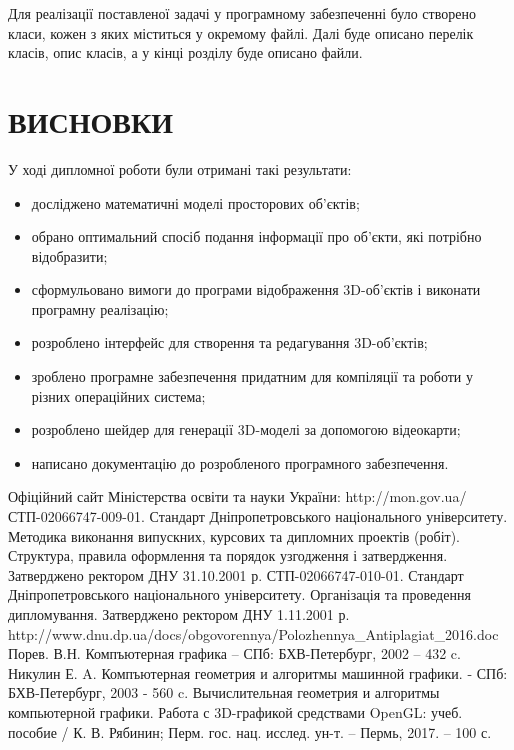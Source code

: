 \let\mypdfximage\pdfximage\def\pdfximage{\immediate\mypdfximage}\documentclass[14pt,a4paper]{extarticle}
\theoremstyle{definition}
\renewcommand{\[}{\begin{singlespace}\begin{equation*}}
\renewcommand{\]}{\end{equation*}\end{singlespace}}
\renewcommand{\+}{\discretionary{\mbox{\scriptsize$\hookleftarrow$}}{}{}}
\begin{document}
Для реалізації поставленої задачі у програмному забезпеченні було створено класи, кожен з яких міститься у окремому файлі. Далі буде описано перелік класів, опис класів, а у кінці розділу буде описано файли.



















\section*{ВИСНОВКИ}
У ході дипломної роботи були отримані такі результати:

\begin{itemize}
\item досліджено математичні моделі просторових об'єктів;
\item обрано оптимальний спосіб подання інформації про об'єкти, які потрібно відобразити;
\item сформульовано вимоги до програми відображення 3D-об'єктів і виконати програмну реалізацію;
\item розроблено інтерфейс для створення та редагування 3D-об'єктів;
\item зроблено програмне забезпечення придатним для компіляції та роботи у різних операційних система;
\item розроблено шейдер для генерації 3D-моделі за допомогою відеокарти;
\item написано документацію до розробленого програмного забезпечення.
\end{itemize}

\begin{thebibliography}{9}
\bibitem{} Офіційний сайт Міністерства освіти та науки України: http://mon.gov.ua/
\bibitem{} СТП-02066747-009-01. Стандарт Дніпропетровського національного університету. Методика виконання випускних, курсових та дипломних проектів (робіт). Структура, правила оформлення та порядок узгодження і затвердження. Затверджено ректором ДНУ 31.10.2001 р.
\bibitem{} СТП-02066747-010-01. Стандарт Дніпропетровського національного університету. Організація та проведення дипломування. Затверджено ректором ДНУ 1.11.2001 р.
\bibitem{} http://www.dnu.dp.ua/docs/obgovorennya/Polozhennya\_Antiplagiat\_2016.doc
 Порев. В.Н. Компъютерная графика -- СПб: БХВ-Петербург, 2002 -- 432 c.
 Никулин Е. A. Компъютерная геометрия и алгоритмы машинной графики. - СПб: БХВ-Петербург, 2003 - 560 c.
 Вычислительная геометрия и алгоритмы компьютерной графики. Работа с 3D-графикой средствами OpenGL: учеб. пособие / К. В. Рябинин; Перм. гос. нац. исслед. ун-т. – Пермь, 2017. – 100 с.
\end{thebibliography}
\end{document}
